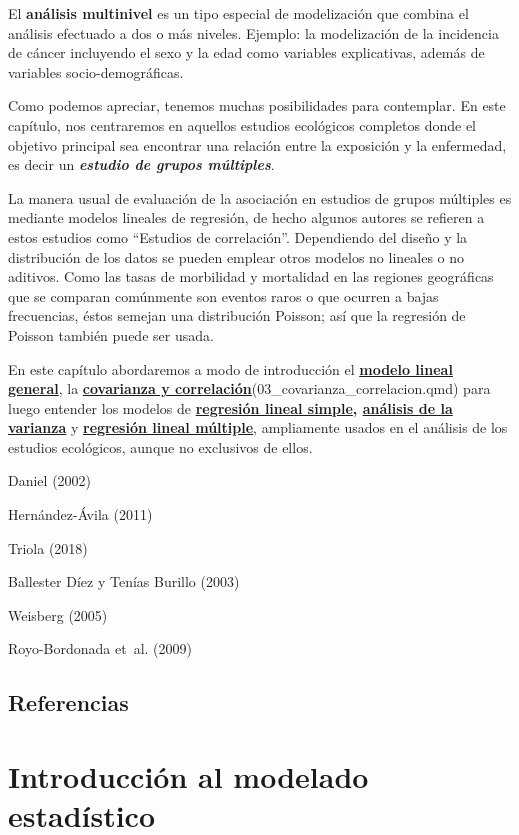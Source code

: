 \documentclass[
  spanish,
  a4paper,
]{scrbook}
\begin{document}
El \textbf{análisis multinivel} es un tipo especial de modelización que
combina el análisis efectuado a dos o más niveles. Ejemplo: la
modelización de la incidencia de cáncer incluyendo el sexo y la edad
como variables explicativas, además de variables socio-demográficas.

Como podemos apreciar, tenemos muchas posibilidades para contemplar. En
este capítulo, nos centraremos en aquellos estudios ecológicos completos
donde el objetivo principal sea encontrar una relación entre la
exposición y la enfermedad, es decir un \textbf{\emph{estudio de grupos
múltiples}}.

La manera usual de evaluación de la asociación en estudios de grupos
múltiples es mediante modelos lineales de regresión, de hecho algunos
autores se refieren a estos estudios como ``Estudios de correlación''.
Dependiendo del diseño y la distribución de los datos se pueden emplear
otros modelos no lineales o no aditivos. Como las tasas de morbilidad y
mortalidad en las regiones geográficas que se comparan comúnmente son
eventos raros o que ocurren a bajas frecuencias, éstos semejan una
distribución Poisson; así que la regresión de Poisson también puede ser
usada.

En este capítulo abordaremos a modo de introducción el
\href{02_mod_estadistico.qmd}{\textbf{modelo lineal general}}, la
\href{03_covarianza_correlacion.qmd}{\textbf{covarianza y
correlación}}(03\_covarianza\_correlacion.qmd) para luego entender los
modelos de \href{04_reg_lineal.qmd}{\textbf{regresión lineal
simple}}\textbf{, \href{05_anova.qmd}{análisis de la varianza}} y
\href{07_reg_lineal_multiple.qmd}{\textbf{regresión lineal múltiple}},
ampliamente usados en el análisis de los estudios ecológicos, aunque no
exclusivos de ellos.

Daniel (2002)

Hernández-Ávila (2011)

Triola (2018)

Ballester Díez y Tenías Burillo (2003)

Weisberg (2005)

Royo-Bordonada et~al. (2009)

\section*{Referencias}\label{referencias-11}


\chapter{Introducción al modelado
estadístico}\label{introducciuxf3n-al-modelado-estaduxedstico}
\end{document}
